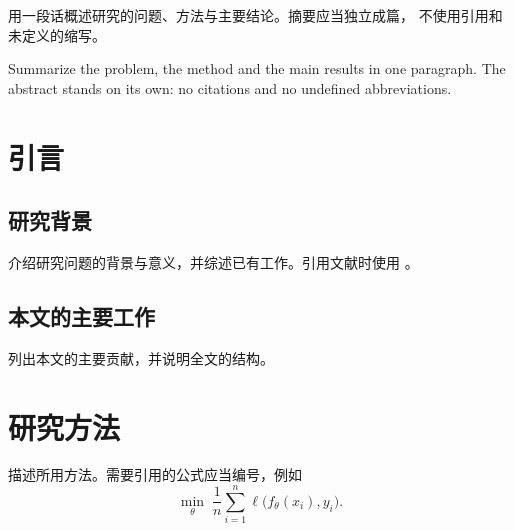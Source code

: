 \documentclass[UTF8,fontset=fandol]{pkuthss}
\newif\ifblind
\begin{document}
\frontmatter
\pagestyle{empty}
\ifblind\makeblind\else\maketitle\fi

\cleardoublepage


\cleardoublepage
\pagestyle{plain}
\setcounter{page}{0}

\begin{cabstract}
  用一段话概述研究的问题、方法与主要结论。摘要应当独立成篇，
不使用引用和未定义的缩写。
\end{cabstract}

\ifblind\begin{beabstract}\else\begin{eabstract}\fi
  Summarize the problem, the method and the main results in one
paragraph. The abstract stands on its own: no citations and no undefined
abbreviations.
\ifblind\end{beabstract}\else\end{eabstract}\fi

\tableofcontents

\mainmatter

\chapter{引言}
\label{chap:intro}

\section{研究背景}
介绍研究问题的背景与意义，并综述已有工作。引用文献时使用
\cite{knuth1984texbook,lamport1994latex}。

\section{本文的主要工作}
列出本文的主要贡献，并说明全文的结构。

\chapter{研究方法}
\label{chap:method}

描述所用方法。需要引用的公式应当编号，例如
\begin{equation}
  \label{eq:objective}
  \min_{\theta} \; \frac{1}{n} \sum_{i=1}^{n} \ell\bigl(f_\theta(x_i), y_i\bigr) .
\end{equation}
\end{document}
